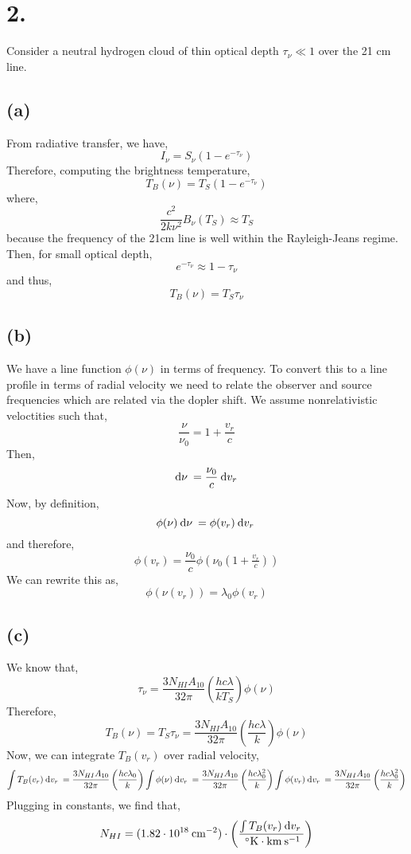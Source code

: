 \documentclass[12pt]{article}
\begin{document}
\section*{2.}

Consider a neutral hydrogen cloud of thin optical depth $\tau_\nu \ll 1$ over the 21 cm line.


\subsection*{(a)}

From radiative transfer, we have,
\[ I_\nu = S_\nu (1 - e^{-\tau_\nu}) \]
Therefore, computing the brightness temperature,
\[ T_B(\nu) = T_S (1 - e^{- \tau_\nu}) \]
where,
\[ \frac{c^2}{2 k \nu^2} B_\nu(T_S) \approx T_S \]
because the frequency of the 21cm line is well within the Rayleigh-Jeans regime. Then, for small optical depth,
\[ e^{-\tau_\nu} \approx 1 - \tau_\nu \]
and thus,
\[ T_B(\nu) = T_S \tau_\nu \]

\subsection*{(b)}

We have a line function $\phi(\nu)$ in terms of frequency. To convert this to a line profile in terms of radial velocity we need to relate the observer and source frequencies which are related via the dopler shift. We assume nonrelativistic veloctities such that,
\[ \frac{\nu}{\nu_0} = 1 + \frac{v_r}{c} \]
Then,
\[ \: \mathrm{d}\nu \: = \frac{\nu_0}{c} \: \mathrm{d}v_r \: \]
Now, by definition,
\[ \phi(\nu) \: \mathrm{d}\nu \: = \phi(v_r) \: \mathrm{d}v_r \: \]
and therefore,
\[ \phi(v_r) = \frac{\nu_0}{c} \phi(\nu_0(1 + \tfrac{v_r}{c})) \]
We can rewrite this as,
\[ \phi(\nu(v_r)) = \lambda_0 \phi(v_r) \]

\subsection*{(c)}

We know that,
\[ \tau_\nu = \frac{3 N_{HI} A_{10}}{32 \pi} \left( \frac{h c \lambda}{k T_S} \right) \phi(\nu)  \]
Therefore,
\[ T_B(\nu) = T_S \tau_\nu = \frac{3 N_{HI} A_{10}}{32 \pi} \left( \frac{h c \lambda}{k} \right) \phi(\nu) \]
Now, we can integrate $T_B(v_r)$ over radial velocity,
\[ \int T_B(v_r) \: \mathrm{d}v_r \: = \frac{3 N_{HI} A_{10}}{32 \pi} \left( \frac{h c \lambda_0}{k} \right) \int  \phi(\nu) \: \mathrm{d}v_r \: = \frac{3 N_{HI} A_{10}}{32 \pi} \left( \frac{h c \lambda_0^2}{k} \right)  \int \phi(v_r) \: \mathrm{d}v_r \: = \frac{3 N_{HI} A_{10}}{32 \pi} \left( \frac{h c \lambda_0^2}{k} \right) \]
Plugging in constants, we find that,
\[ N_{HI} = (1.82 \cdot 10^{18} \: \text{cm}^{-2} ) \cdot \left( \frac{\int T_B(v_r) \: \mathrm{d}v_r \:}{\: ^\circ\mathrm{K} \cdot \text{km} \: \text{s}^{-1}}\right)
\]
\end{document}
